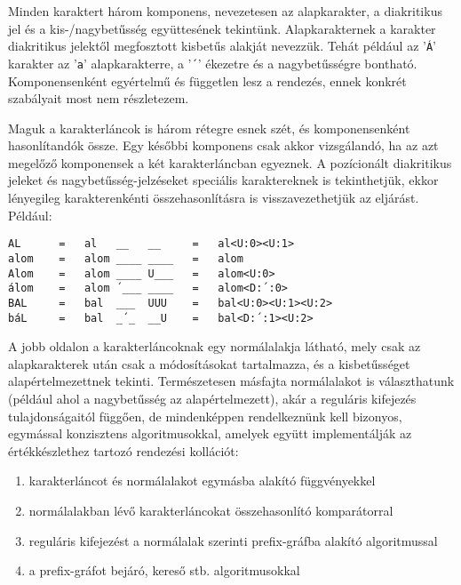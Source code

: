 \documentclass[
    parspace,
    noindent,
    nohyp,
]{elteiktdk}[2023/04/10]
\begin{document}
Minden karaktert három komponens,
nevezetesen az alapkarakter, a diakritikus jel és a kis-/nagybetűsség együttesének tekintünk.
Alapkarakternek a karakter diakritikus jelektől megfosztott kisbetűs alakját nevezzük.
Tehát például az '\texttt{Á}' karakter az '\texttt{a}' alapkarakterre,
a '\texttt{´}' ékezetre és a nagybetűsségre bontható.
Komponensenként egyértelmű és független lesz a rendezés,
ennek konkrét szabályait most nem részletezem.

Maguk a karakterláncok is három rétegre esnek szét, és komponensenként hasonlítandók össze.
Egy későbbi komponens csak akkor vizsgálandó,
ha az azt megelőző komponensek a két karakterláncban egyeznek.
A pozícionált diakritikus jeleket és nagybetűsség-jelzéseket speciális karaktereknek is tekinthetjük,
ekkor lényegileg karakterenkénti összehasonlításra is visszavezethetjük az eljárást.
Például:

\begin{verbatim}
AL      =   al   __   __     =   al<U:0><U:1>
alom    =   alom ____ ____   =   alom
Alom    =   alom ____ U___   =   alom<U:0>
álom    =   alom ´___ ____   =   alom<D:´:0>
BAL     =   bal  ___  UUU    =   bal<U:0><U:1><U:2>
báL     =   bal  _´_  __U    =   bal<D:´:1><U:2>
\end{verbatim}

A jobb oldalon a karakterláncoknak egy normálalakja látható,
mely csak az alapkarakterek után csak a módosításokat tartalmazza,
és a kisbetűsséget alapértelmezettnek tekinti.
Természetesen másfajta normálalakot is választhatunk (például ahol a nagybetűsség az alapértelmezett),
akár a reguláris kifejezés tulajdonságaitól függően,
de mindenképpen rendelkeznünk kell bizonyos, egymással konzisztens algoritmusokkal,
amelyek együtt implementálják az értékkészlethez tartozó rendezési kollációt:

\begin{enumerate}
    \item karakterláncot és normálalakot egymásba alakító függvényekkel
    \item normálalakban lévő karakterláncokat összehasonlító komparátorral
    \item reguláris kifejezést a normálalak szerinti prefix-gráfba alakító algoritmussal
    \item a prefix-gráfot bejáró, kereső stb. algoritmusokkal
\end{enumerate}

\end{document}
